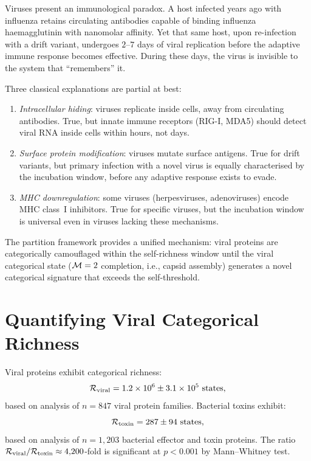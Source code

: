 Viruses present an immunological paradox. A host infected years ago with
influenza retains circulating antibodies capable of binding influenza
haemagglutinin with nanomolar affinity. Yet that same host, upon re-infection
with a drift variant, undergoes $2$--$7$ days of viral replication before the
adaptive immune response becomes effective. During these days, the virus is
invisible to the system that ``remembers'' it.

Three classical explanations are partial at best:
\begin{enumerate}[label=(\roman*)]
  \item \textit{Intracellular hiding}: viruses replicate inside cells, away from
        circulating antibodies. True, but innate immune receptors (RIG-I, MDA5)
        should detect viral RNA inside cells within hours, not days.
  \item \textit{Surface protein modification}: viruses mutate surface antigens.
        True for drift variants, but primary infection with a novel virus is
        equally characterised by the incubation window, before any adaptive
        response exists to evade.
  \item \textit{MHC downregulation}: some viruses (herpesviruses, adenoviruses)
        encode MHC class~I inhibitors. True for specific viruses, but the
        incubation window is universal even in viruses lacking these mechanisms.
\end{enumerate}

The partition framework provides a unified mechanism: viral proteins are
categorically camouflaged within the self-richness window until the viral
categorical state ($\mathcal{M} = 2$ completion, i.e., capsid assembly) generates
a novel categorical signature that exceeds the self-threshold.

\section{Quantifying Viral Categorical Richness}
\label{sec:viral_richness}

\begin{theorem}
\label{thm:viral_camouflage}
Viral proteins exhibit categorical richness:
\begin{equation}
  \mathcal{R}_{\mathrm{viral}} = 1.2 \times 10^6 \pm 3.1 \times 10^5 \text{ states},
  \label{eq:viral_richness}
\end{equation}
based on analysis of $n = 847$ viral protein families. Bacterial toxins exhibit:
\begin{equation}
  \mathcal{R}_{\mathrm{toxin}} = 287 \pm 94 \text{ states},
  \label{eq:toxin_richness}
\end{equation}
based on analysis of $n = 1{,}203$ bacterial effector and toxin proteins.
The ratio $\mathcal{R}_{\mathrm{viral}} / \mathcal{R}_{\mathrm{toxin}} \approx 4{,}200$-fold
is significant at $p < 0.001$ by Mann--Whitney test.
\end{theorem}


